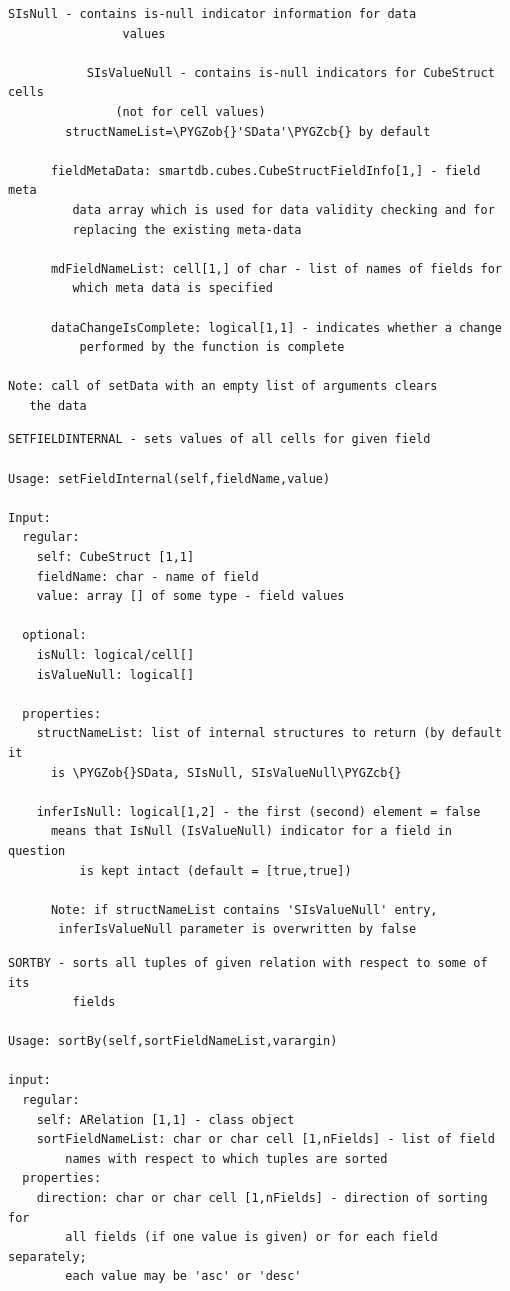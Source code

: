 \documentclass[letterpaper,10pt,english]{sphinxmanual}
\def\PYGZob{\char`\{}
\def\PYGZcb{\char`\}}
\begin{document}
\begin{Verbatim}[commandchars=\\\{\}]
           SIsNull - contains is-null indicator information for data
                values

           SIsValueNull - contains is-null indicators for CubeStruct cells
               (not for cell values)
        structNameList=\PYGZob{}'SData'\PYGZcb{} by default

      fieldMetaData: smartdb.cubes.CubeStructFieldInfo[1,] - field meta
         data array which is used for data validity checking and for
         replacing the existing meta-data

      mdFieldNameList: cell[1,] of char - list of names of fields for
         which meta data is specified

      dataChangeIsComplete: logical[1,1] - indicates whether a change
          performed by the function is complete

Note: call of setData with an empty list of arguments clears
   the data
\end{Verbatim}

\begin{Verbatim}[commandchars=\\\{\}]
SETFIELDINTERNAL - sets values of all cells for given field

Usage: setFieldInternal(self,fieldName,value)

Input:
  regular:
    self: CubeStruct [1,1]
    fieldName: char - name of field
    value: array [] of some type - field values

  optional:
    isNull: logical/cell[]
    isValueNull: logical[]

  properties:
    structNameList: list of internal structures to return (by default it
      is \PYGZob{}SData, SIsNull, SIsValueNull\PYGZcb{}

    inferIsNull: logical[1,2] - the first (second) element = false
      means that IsNull (IsValueNull) indicator for a field in question
          is kept intact (default = [true,true])

      Note: if structNameList contains 'SIsValueNull' entry,
       inferIsValueNull parameter is overwritten by false
\end{Verbatim}

\begin{Verbatim}[commandchars=\\\{\}]
SORTBY - sorts all tuples of given relation with respect to some of its
         fields

Usage: sortBy(self,sortFieldNameList,varargin)

input:
  regular:
    self: ARelation [1,1] - class object
    sortFieldNameList: char or char cell [1,nFields] - list of field
        names with respect to which tuples are sorted
  properties:
    direction: char or char cell [1,nFields] - direction of sorting for
        all fields (if one value is given) or for each field separately;
        each value may be 'asc' or 'desc'
\end{Verbatim}
\end{document}
